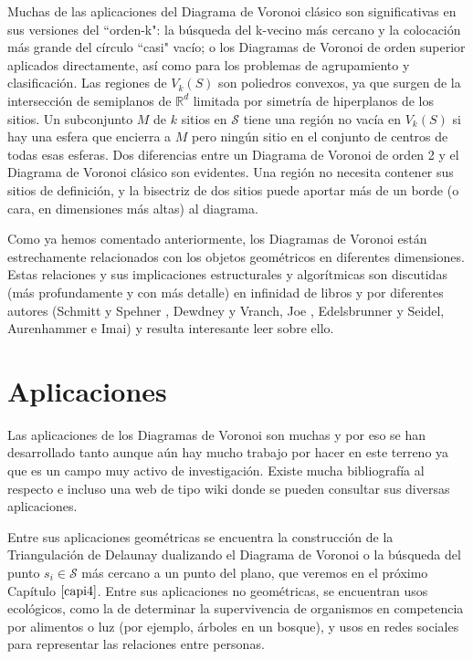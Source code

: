 Muchas de las aplicaciones del Diagrama de Voronoi clásico son significativas en sus versiones del ``orden-k": la búsqueda del k-vecino más cercano y la colocación más grande del círculo ``casi" vacío; o los Diagramas de Voronoi de orden superior aplicados directamente, así como para los problemas de agrupamiento y clasificación.
Las regiones de $V_{k}(S)$ son poliedros convexos, ya que surgen de la intersección de semiplanos de $\mathbb{R}^d$ limitada por simetría de hiperplanos de los sitios. Un subconjunto $M$ de $k$ sitios en $\mathcal{S}$ tiene una región no vacía en $V_{k}(S)$ si hay una esfera que encierra a $M$ pero ningún sitio en el conjunto de centros de todas esas esferas.
Dos diferencias entre un Diagrama de Voronoi de orden 2 y el Diagrama de Voronoi clásico son evidentes. Una región no necesita contener sus sitios de definición, y la bisectriz de dos sitios puede aportar más de un borde (o cara, en dimensiones más altas) al diagrama.
\vspace{0.3cm}

Como ya hemos comentado anteriormente, los Diagramas de Voronoi están estrechamente relacionados con los objetos geométricos en diferentes dimensiones. Estas relaciones y sus implicaciones estructurales y algorítmicas son discutidas (más profundamente y con más detalle) en infinidad de libros y por diferentes autores (Schmitt y Spehner \cite{schspen}, Dewdney y Vranch\cite{dewvran}, Joe \cite{joe}, Edelsbrunner y Seidel\cite{edersei}, Aurenhammer e Imai\cite{aureimai}) y resulta interesante leer sobre ello.

\section{Aplicaciones}\label{aplicaciones}

Las aplicaciones de los Diagramas de Voronoi son muchas y por eso se han desarrollado tanto aunque aún hay mucho trabajo por hacer en este terreno ya que es un campo muy activo de investigación. Existe mucha bibliografía al respecto e incluso una web de tipo wiki \cite{voronoi} donde se pueden consultar sus diversas aplicaciones.
\vspace{0.3cm}

Entre sus aplicaciones geométricas se encuentra la construcción de la Triangulación de Delaunay dualizando el Diagrama de Voronoi o la búsqueda del punto $s_{i} \in \mathcal{S}$ más cercano a un punto del plano, que veremos en el próximo Capítulo $\ref{capi4}$. Entre sus aplicaciones no geométricas, se encuentran usos ecológicos, como la de determinar la supervivencia de organismos en competencia por alimentos o luz (por ejemplo, árboles en un bosque), y usos en redes sociales para representar las relaciones entre personas.

